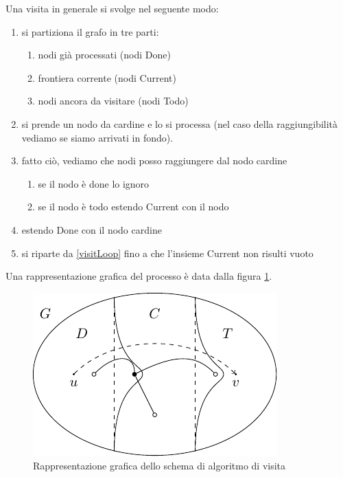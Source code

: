 Una visita in generale si svolge nel seguente modo:
\begin{enumerate}
    \item si partiziona il grafo in tre parti:
    \begin{enumerate}
        \item nodi già processati (nodi Done)
        \item frontiera corrente (nodi Current)
        \item nodi ancora da visitare (nodi Todo)
    \end{enumerate}
    \item\label{visitLoop} si prende un nodo da cardine e lo si processa (nel caso della raggiungibilità vediamo se
    siamo arrivati in fondo).
    \item fatto ciò, vediamo che nodi posso raggiungere dal nodo cardine
    \begin{enumerate}
        \item se il nodo è done lo ignoro
        \item se il nodo è todo estendo Current con il nodo
    \end{enumerate}
    \item estendo Done con il nodo cardine
    \item si riparte da \ref{visitLoop} fino a che l'insieme Current non risulti vuoto
\end{enumerate}

Una rappresentazione grafica del processo è data dalla figura \ref{GraphVisit}.

\begin{figure}[h]
    \begin{center}
        \includegraphics{img/GraphVisit.pdf}
    \end{center}
    \caption{Rappresentazione grafica dello schema di algoritmo di visita}
    \label{GraphVisit}
\end{figure}

